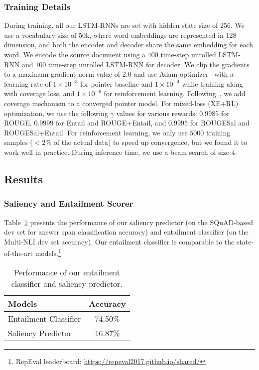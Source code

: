 \documentclass[11pt,a4paper]{article}
\begin{document}
\subsubsection{Training Details}
\label{subsec:suppl:training-details}
During training, all our LSTM-RNNs are set with hidden state size of $256$. We use a vocabulary size of $50\textrm{k}$, where word embeddings are represented in $128$ dimension, and both the encoder and decoder share the same embedding for each word. We encode the source document using a $400$ time-step unrolled LSTM-RNN and $100$ time-step unrolled LSTM-RNN for decoder. We clip the gradients to a maximum gradient norm value of $2.0$ and use Adam optimizer~\cite{kingma2014adam} with a learning rate of $1 \times 10^{-3}$ for pointer baseline and $1 \times 10^{-4}$ while training along with coverage loss, and $1 \times 10^{-6}$ for reinforcement learning. Following~, we add coverage mechanism to a converged pointer model. For mixed-loss (XE+RL) optimization, we use the following $\gamma$ values for various rewards: $0.9985$ for ROUGE, $0.9999$ for Entail and ROUGE+Entail, and $0.9995$ for ROUGESal and ROUGESal+Entail. For reinforcement learning, we only use $5000$ training samples ($< 2\%$ of the actual data) to speed up convergence, but we found it to work well in practice. During inference time, we use a beam search of size $4$.



\subsection{Results}

\subsubsection{Saliency and Entailment Scorer}
Table~\ref{table:entailment_saliency_predictor} presents the performance of our saliency predictor (on the SQuAD-based dev set for answer span classification accuracy) and entailment classifier (on the Multi-NLI dev set accuracy). Our entailment classifier is comparable to the state-of-the-art models.\footnote{RepEval leaderboard: \url{https://repeval2017.github.io/shared/}} 
\begin{table}
\begin{center}
\begin{tabular}{|l|c|}
\hline
Models & Accuracy \\
\hline
Entailment Classifier & 74.50\% \\
Saliency Predictor & 16.87\% \\
\hline
\end{tabular}
\end{center}
\caption{Performance of our entailment classifier and saliency predictor.}
\label{table:entailment_saliency_predictor}
\end{table}
\end{document}
